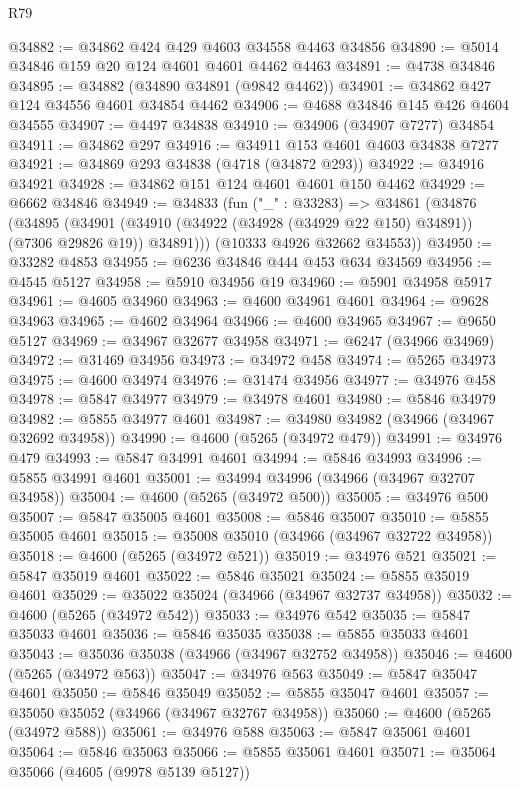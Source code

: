 \begin{lexlean}{R79}
\begin{coremodule}
@34882 := @34862 @424 @429 @4603 @34558 @4463 @34856
@34890 := @5014 @34846 @159 @20 @124 @4601 @4601 @4462 @4463
@34891 := @4738 @34846
@34895 := @34882 (@34890 @34891 (@9842 @4462))
@34901 := @34862 @427 @124 @34556 @4601 @34854 @4462
@34906 := @4688 @34846 @145 @426 @4604 @34555
@34907 := @4497 @34838
@34910 := @34906 (@34907 @7277) @34854
@34911 := @34862 @297
@34916 := @34911 @153 @4601 @4603 @34838 @7277
@34921 := @34869 @293 @34838 (@4718 (@34872 @293))
@34922 := @34916 @34921
@34928 := @34862 @151 @124 @4601 @4601 @150 @4462
@34929 := @6662 @34846
@34949 := @34833
    (fun ("_" : @33283) =>
    @34861
      (@34876
        (@34895
          (@34901 (@34910 (@34922 (@34928 (@34929 @22 @150) @34891)) (@7306 @29826 @19)) @34891)))
      (@10333 @4926 @32662 @34553))
@34950 := @33282 @4853
@34955 := @6236 @34846 @444 @453 @634 @34569
@34956 := @4545 @5127
@34958 := @5910 @34956 @19
@34960 := @5901 @34958 @5917
@34961 := @4605 @34960
@34963 := @4600 @34961 @4601
@34964 := @9628 @34963
@34965 := @4602 @34964
@34966 := @4600 @34965
@34967 := @9650 @5127
@34969 := @34967 @32677 @34958
@34971 := @6247 (@34966 @34969)
@34972 := @31469 @34956
@34973 := @34972 @458
@34974 := @5265 @34973
@34975 := @4600 @34974
@34976 := @31474 @34956
@34977 := @34976 @458
@34978 := @5847 @34977
@34979 := @34978 @4601
@34980 := @5846 @34979
@34982 := @5855 @34977 @4601
@34987 := @34980 @34982 (@34966 (@34967 @32692 @34958))
@34990 := @4600 (@5265 (@34972 @479))
@34991 := @34976 @479
@34993 := @5847 @34991 @4601
@34994 := @5846 @34993
@34996 := @5855 @34991 @4601
@35001 := @34994 @34996 (@34966 (@34967 @32707 @34958))
@35004 := @4600 (@5265 (@34972 @500))
@35005 := @34976 @500
@35007 := @5847 @35005 @4601
@35008 := @5846 @35007
@35010 := @5855 @35005 @4601
@35015 := @35008 @35010 (@34966 (@34967 @32722 @34958))
@35018 := @4600 (@5265 (@34972 @521))
@35019 := @34976 @521
@35021 := @5847 @35019 @4601
@35022 := @5846 @35021
@35024 := @5855 @35019 @4601
@35029 := @35022 @35024 (@34966 (@34967 @32737 @34958))
@35032 := @4600 (@5265 (@34972 @542))
@35033 := @34976 @542
@35035 := @5847 @35033 @4601
@35036 := @5846 @35035
@35038 := @5855 @35033 @4601
@35043 := @35036 @35038 (@34966 (@34967 @32752 @34958))
@35046 := @4600 (@5265 (@34972 @563))
@35047 := @34976 @563
@35049 := @5847 @35047 @4601
@35050 := @5846 @35049
@35052 := @5855 @35047 @4601
@35057 := @35050 @35052 (@34966 (@34967 @32767 @34958))
@35060 := @4600 (@5265 (@34972 @588))
@35061 := @34976 @588
@35063 := @5847 @35061 @4601
@35064 := @5846 @35063
@35066 := @5855 @35061 @4601
@35071 := @35064 @35066 (@4605 (@9978 @5139 @5127))

\end{coremodule}
\end{lexlean}
